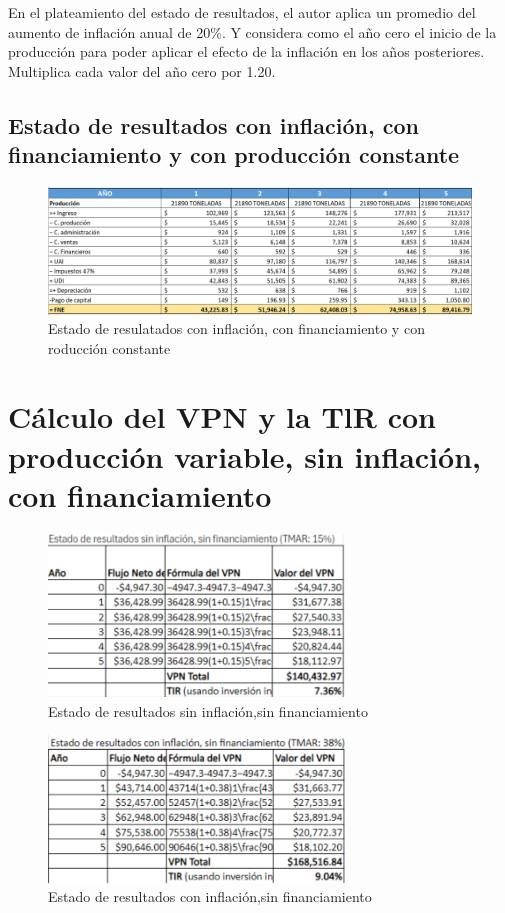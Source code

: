 En el plateamiento del estado de resultados, el autor aplica un promedio del aumento de inflación anual de 20\%.  Y considera como el año cero el inicio de la producción para poder aplicar el efecto de la inflación en los años posteriores. Multiplica cada valor del año cero por 1.20.



\subsection{Estado de resultados con inflación, con financiamiento y con producción constante}


\begin{figure}[H]
    \centering	
    \includegraphics[width=1.1\textwidth]{chapters/ELC_15.png} 
    \caption{Estado de resulatados con inflación, con financiamiento y con roducción constante}
\label{fig:croquis190125}
\end{figure}

 \section{Cálculo del VPN y la TlR con producción variable, sin inflación, con financiamiento}

 \begin{figure}[H]
    \centering	
    \includegraphics[width=0.7\textwidth]{chapters/ELC_16.png} 
    \caption{Estado de resultados sin inflación,sin financiamiento}
\label{fig:croquis190125}
\end{figure}

\begin{figure}[H]
    \centering	
    \includegraphics[width=0.7\textwidth]{chapters/ELC_17.png} 
    \caption{Estado de resultados con inflación,sin financiamiento}
\label{fig:croquis190125}
\end{figure}

